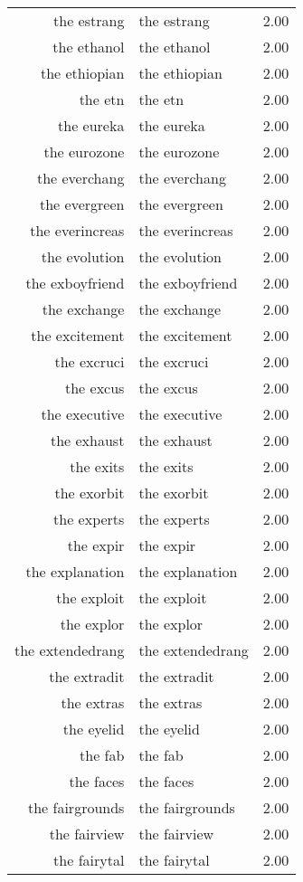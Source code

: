 \begin{table}[ht]
\begin{tabular}{rlr}
  the estrang & the estrang & 2.00 \\ 
  the ethanol & the ethanol & 2.00 \\ 
  the ethiopian & the ethiopian & 2.00 \\ 
  the etn & the etn & 2.00 \\ 
  the eureka & the eureka & 2.00 \\ 
  the eurozone & the eurozone & 2.00 \\ 
  the everchang & the everchang & 2.00 \\ 
  the evergreen & the evergreen & 2.00 \\ 
  the everincreas & the everincreas & 2.00 \\ 
  the evolution & the evolution & 2.00 \\ 
  the exboyfriend & the exboyfriend & 2.00 \\ 
  the exchange & the exchange & 2.00 \\ 
  the excitement & the excitement & 2.00 \\ 
  the excruci & the excruci & 2.00 \\ 
  the excus & the excus & 2.00 \\ 
  the executive & the executive & 2.00 \\ 
  the exhaust & the exhaust & 2.00 \\ 
  the exits & the exits & 2.00 \\ 
  the exorbit & the exorbit & 2.00 \\ 
  the experts & the experts & 2.00 \\ 
  the expir & the expir & 2.00 \\ 
  the explanation & the explanation & 2.00 \\ 
  the exploit & the exploit & 2.00 \\ 
  the explor & the explor & 2.00 \\ 
  the extendedrang & the extendedrang & 2.00 \\ 
  the extradit & the extradit & 2.00 \\ 
  the extras & the extras & 2.00 \\ 
  the eyelid & the eyelid & 2.00 \\ 
  the fab & the fab & 2.00 \\ 
  the faces & the faces & 2.00 \\ 
  the fairgrounds & the fairgrounds & 2.00 \\ 
  the fairview & the fairview & 2.00 \\ 
  the fairytal & the fairytal & 2.00 \\ 

\end{tabular}
\end{table}
